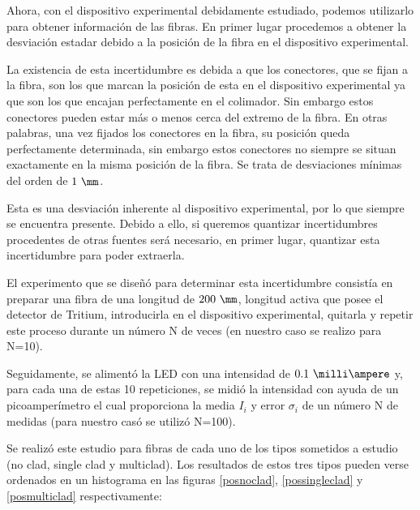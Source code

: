 Ahora, con el dispositivo experimental debidamente estudiado, podemos utilizarlo para obtener información de las fibras. En primer lugar procedemos a obtener la desviación estadar debido a la posición de la fibra en el dispositivo experimental. 

La existencia de esta incertidumbre es debida a que los conectores, que se fijan a la fibra, son los que marcan la posición de esta en el dispositivo experimental ya que son los que encajan perfectamente en el colimador. Sin embargo estos conectores pueden estar más o menos cerca del extremo de la fibra. En otras palabras, una vez fijados los conectores en la fibra, su posición queda perfectamente determinada, sin embargo estos conectores no siempre se situan exactamente en la misma posición de la fibra. Se trata de desviaciones mínimas del orden de $1~\mm$.

Esta es una desviación inherente al dispositivo experimental, por lo que siempre se encuentra presente. Debido a ello, si queremos quantizar incertidumbres procedentes de otras fuentes será necesario, en primer lugar, quantizar esta incertidumbre para poder extraerla. 

El experimento que se diseñó para determinar esta incertidumbre consistía en preparar una fibra de una longitud de $200~\mm$, longitud activa que posee el detector de Tritium, introducirla en el dispositivo experimental, quitarla y repetir este proceso durante un número N de veces (en nuestro caso se realizo para N=10). 

Seguidamente, se alimentó la LED con una intensidad de $0.1~\milli\ampere$ y, para cada una de estas 10 repeticiones, se midió la intensidad con ayuda de un picoamperímetro el cual proporciona la media $I_i$ y error $\sigma_{i}$ de un número N de medidas (para nuestro casó se utilizó N=100).

Se realizó este estudio para fibras de cada uno de los tipos sometidos a estudio (no clad, single clad y multiclad). Los resultados de estos tres tipos pueden verse ordenados en un histograma en las figuras \ref{posnoclad}, \ref{possingleclad} y \ref{posmulticlad} respectivamente:


